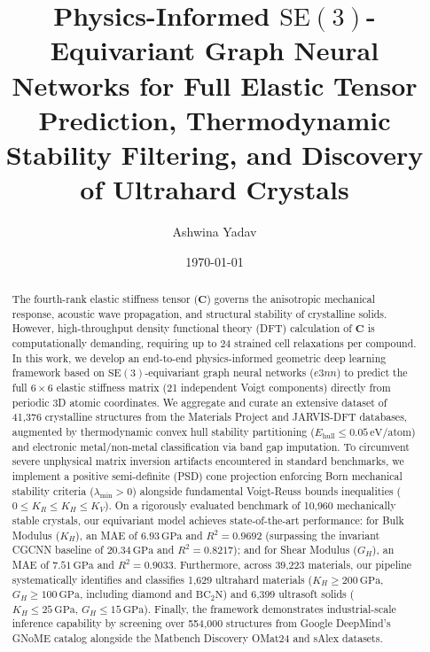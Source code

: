 \documentclass[twocolumn,10pt,aps,prb,superscriptaddress,floatfix]{revtex4-2}
\begin{document}
\title{Physics-Informed $\mathrm{SE}(3)$-Equivariant Graph Neural Networks for Full Elastic Tensor Prediction, Thermodynamic Stability Filtering, and Discovery of Ultrahard Crystals}

\author{Ashwina Yadav}

\date{\today}

\begin{abstract}
The fourth-rank elastic stiffness tensor ($\bm{C}$) governs the anisotropic mechanical response, acoustic wave propagation, and structural stability of crystalline solids. However, high-throughput density functional theory (DFT) calculation of $\bm{C}$ is computationally demanding, requiring up to 24 strained cell relaxations per compound. In this work, we develop an end-to-end physics-informed geometric deep learning framework based on $\mathrm{SE}(3)$-equivariant graph neural networks ($e3nn$) to predict the full $6 \times 6$ elastic stiffness matrix (21 independent Voigt components) directly from periodic 3D atomic coordinates. We aggregate and curate an extensive dataset of 41,376 crystalline structures from the Materials Project and JARVIS-DFT databases, augmented by thermodynamic convex hull stability partitioning ($E_{\mathrm{hull}} \le 0.05\,\mathrm{eV/atom}$) and electronic metal/non-metal classification via band gap imputation. To circumvent severe unphysical matrix inversion artifacts encountered in standard benchmarks, we implement a positive semi-definite (PSD) cone projection enforcing Born mechanical stability criteria ($\lambda_{\min} > 0$) alongside fundamental Voigt-Reuss bounds inequalities ($0 \le K_R \le K_H \le K_V$). On a rigorously evaluated benchmark of 10,960 mechanically stable crystals, our equivariant model achieves state-of-the-art performance: for Bulk Modulus ($K_H$), an MAE of $6.93\,\mathrm{GPa}$ and $R^2 = 0.9692$ (surpassing the invariant CGCNN baseline of $20.34\,\mathrm{GPa}$ and $R^2 = 0.8217$); and for Shear Modulus ($G_H$), an MAE of $7.51\,\mathrm{GPa}$ and $R^2 = 0.9033$. Furthermore, across 39,223 materials, our pipeline systematically identifies and classifies 1,629 ultrahard materials ($K_H \ge 200\,\mathrm{GPa}$, $G_H \ge 100\,\mathrm{GPa}$, including diamond and $\mathrm{BC}_2\mathrm{N}$) and 6,399 ultrasoft solids ($K_H \le 25\,\mathrm{GPa}$, $G_H \le 15\,\mathrm{GPa}$). Finally, the framework demonstrates industrial-scale inference capability by screening over 554,000 structures from Google DeepMind's GNoME catalog alongside the Matbench Discovery OMat24 and sAlex datasets.
\end{abstract}
\end{document}

